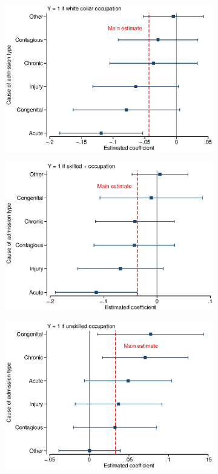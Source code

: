 \documentclass[12pt,english]{article}
\begin{document}
\begin{figure}[!ht]
\begin{subfigure}{0.49\textwidth}
	\includegraphics[width=1.00\linewidth]{../output/02_appendix/figure_a10_panel_3.eps}
\end{subfigure}
\begin{subfigure}{0.49\textwidth}
	\centering
	\includegraphics[width=1.00\linewidth]{../output/02_appendix/figure_a10_panel_4.eps}
\end{subfigure}
\begin{subfigure}{0.49\textwidth}
	\centering
	\includegraphics[width=1.00\linewidth]{../output/02_appendix/figure_a10_panel_5.eps}

\end{subfigure}
\end{figure}
\end{document}
